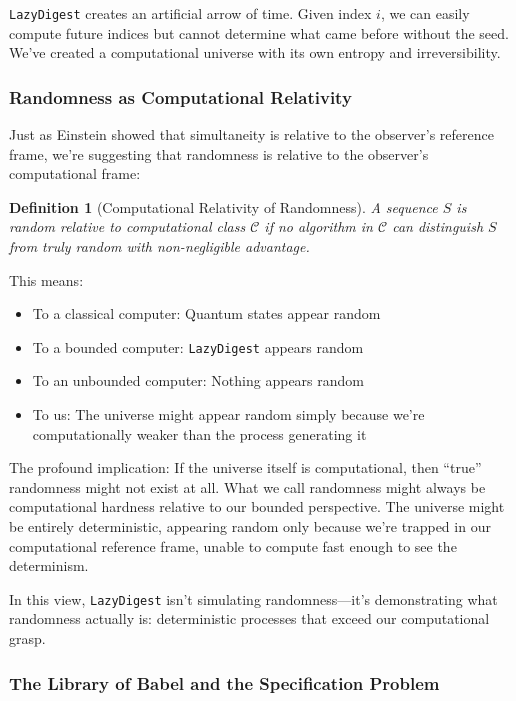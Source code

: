 \documentclass[11pt]{article}
\newtheorem{definition}{Definition}
\begin{document}
\texttt{LazyDigest} creates an artificial arrow of time. Given index $i$, we can easily compute future indices but cannot determine what came before without the seed. We've created a computational universe with its own entropy and irreversibility.

\subsubsection{Randomness as Computational Relativity}

Just as Einstein showed that simultaneity is relative to the observer's reference frame, we're suggesting that randomness is relative to the observer's computational frame:

\begin{definition}[Computational Relativity of Randomness]
A sequence $S$ is random relative to computational class $\mathcal{C}$ if no algorithm in $\mathcal{C}$ can distinguish $S$ from truly random with non-negligible advantage.
\end{definition}

This means:
\begin{itemize}
\item To a classical computer: Quantum states appear random
\item To a bounded computer: \texttt{LazyDigest} appears random
\item To an unbounded computer: Nothing appears random
\item To us: The universe might appear random simply because we're computationally weaker than the process generating it
\end{itemize}

The profound implication: If the universe itself is computational, then ``true'' randomness might not exist at all. What we call randomness might always be computational hardness relative to our bounded perspective. The universe might be entirely deterministic, appearing random only because we're trapped in our computational reference frame, unable to compute fast enough to see the determinism.

In this view, \texttt{LazyDigest} isn't simulating randomness---it's demonstrating what randomness actually is: deterministic processes that exceed our computational grasp.

\subsubsection{The Library of Babel and the Specification Problem}
\end{document}
